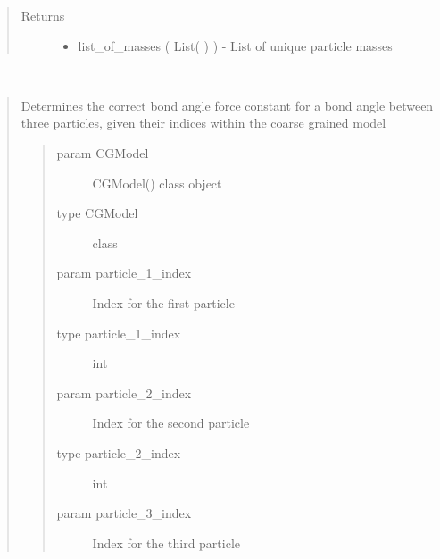 \documentclass[letterpaper,12pt,english,openany,oneside]{sphinxmanual}
\begin{document}
\begin{fulllineitems}
\begin{fulllineitems}
\begin{quote}
\begin{description}
\item[{Returns}] \leavevmode
\begin{itemize}
\item {} 
list\_of\_masses ( List(  ) ) - List of unique particle masses

\end{itemize}


\end{description}\end{quote}

\end{fulllineitems}


\begin{fulllineitems}
\label{\detokenize{cg_model:cg_model.cgmodel.CGModel.get_bond_angle_force_constant}}~\begin{quote}

Determines the correct bond angle force constant for a bond angle between three particles, given their indices within the coarse grained model
\begin{quote}\begin{description}
\item[{param CGModel}] \leavevmode
CGModel() class object

\item[{type CGModel}] \leavevmode
class

\item[{param particle\_1\_index}] \leavevmode
Index for the first particle

\item[{type particle\_1\_index}] \leavevmode
int

\item[{param particle\_2\_index}] \leavevmode
Index for the second particle

\item[{type particle\_2\_index}] \leavevmode
int

\item[{param particle\_3\_index}] \leavevmode
Index for the third particle


\end{description}
\end{quote}
\end{quote}
\end{fulllineitems}
\end{fulllineitems}
\end{document}
